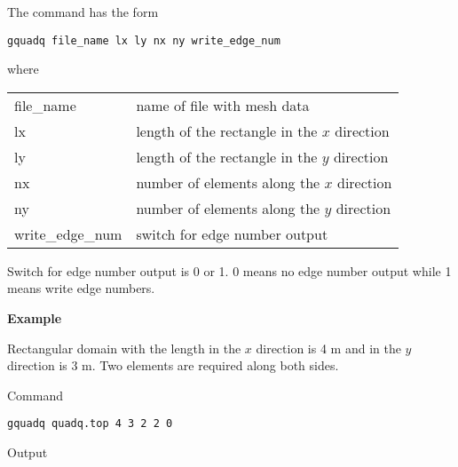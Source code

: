 \documentclass[12pt]{book}
\begin{document}
\vspace{2mm}
\noindent
The command has the form

{\tt gquadq file\_name lx ly nx ny write\_edge\_num}

\vspace{2mm}
\noindent
where

\vspace{2mm}
\noindent
\begin{center}
\begin{tabular}{ll}
file\_name & name of file with mesh data
\\
lx & length of the rectangle in the $x$ direction
\\
ly & length of the rectangle in the $y$ direction
\\
nx & number of elements along the $x$ direction
\\
ny & number of elements along the $y$ direction
\\
write\_edge\_num & switch for edge number output
\\
\end{tabular}
\end{center}

\noindent
Switch for edge number output is 0 or 1. 0 means no edge number output
while 1 means write edge numbers.

\vspace{3mm}
\noindent
{\bf Example}

\noindent
Rectangular domain with the length in the $x$ direction is 4 m and in the
$y$ direction is 3 m. Two elements are required along both sides.

\noindent
Command

{\tt gquadq quadq.top 4 3 2 2 0}

\noindent
Output
\end{document}
